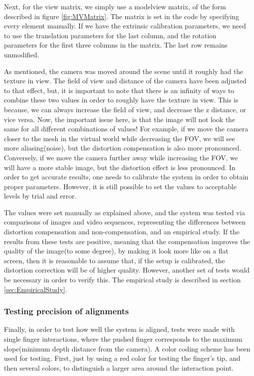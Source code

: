 \documentclass[]{article}
\begin{document}
Next, for the view matrix, we simply use a modelview matrix, of the form described in figure \ref{fig:MVMatrix}. The matrix is set in the code by specifying every element manually. If we have the extrinsic calibration parameters, we need to use the translation parameters for the last column, and the rotation parameters for the first three columns in the matrix. The last row remains unmodified.

As mentioned, the camera was moved around the scene until it roughly had the texture in view. The field of view and distance of the camera have been adjusted to that effect, but, it is important to note that there is an infinity of ways to combine these two values in order to roughly have the texture in view. This is because, we can always increase the field of view, and decrease the z distance, or vice versa. Now, the important issue here, is that the image will not look the same for all different combinations of values! For example, if we move the camera closer to the mesh in the virtual world while decreasing the FOV, we will see more aliasing(noise), but the distortion compensation is also more pronounced. Conversely, if we move the camera further away while increasing the FOV, we will have a more stable image, but the distortion effect is less pronounced. In order to get accurate results, one needs to calibrate the system in order to obtain proper parameters. However, it is still possible to set the values to acceptable levels by trial and error.

The values were set manually as explained above, and the system was tested via comparisons of images and video sequences, representing the differences between distortion compensation and non-compensation, and an empirical study. If the results from these tests are positive, meaning that the compensation improves the quality of the image(to some degree), by making it look more like on a flat screen, then it is reasonable to assume that, if the setup is calibrated, the distortion correction will be of higher quality. However, another set of tests would be necessary in order to verify this. The empirical study is described in section \ref{sec:EmpiricalStudy}.

\subsubsection{Testing precision of alignments}

Finally, in order to test how well the system is aligned, tests were made with single finger interactions, where the pushed finger corresponds to the maximum slope(minimum depth distance from the camera). A color coding scheme has been used for testing. First, just by using a red color for testing the finger's tip, and then several colors, to distinguish a larger area around the interaction point. 
\end{document}
